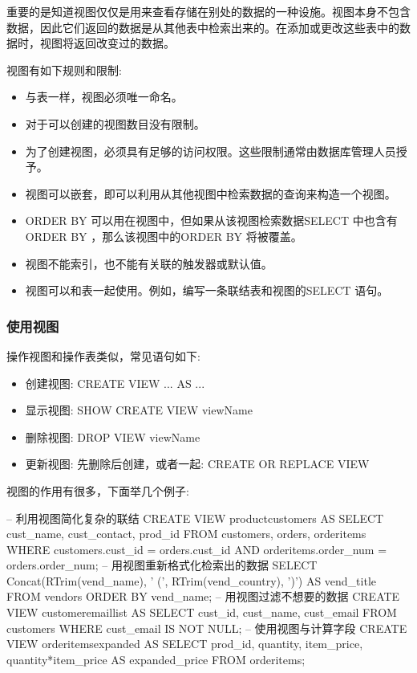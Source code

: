 重要的是知道视图仅仅是用来查看存储在别处的数据的一种设施。视图本身不包含数据，因此它们返回的数据是从其他表中检索出来的。在添加或更改这些表中的数据时，视图将返回改变过的数据。


 视图有如下规则和限制:

 \begin{itemize}
    \item 与表一样，视图必须唯一命名。
    \item 对于可以创建的视图数目没有限制。
    \item 为了创建视图，必须具有足够的访问权限。这些限制通常由数据库管理人员授予。
    \item 视图可以嵌套，即可以利用从其他视图中检索数据的查询来构造一个视图。
    \item ORDER BY 可以用在视图中，但如果从该视图检索数据SELECT 中也含有ORDER BY ，那么该视图中的ORDER BY 将被覆盖。
    \item 视图不能索引，也不能有关联的触发器或默认值。
    \item 视图可以和表一起使用。例如，编写一条联结表和视图的SELECT 语句。
 \end{itemize}

 \subsubsection{使用视图}

操作视图和操作表类似，常见语句如下:
 \begin{itemize}
    \item 创建视图: CREATE VIEW ... AS ...
    \item 显示视图: SHOW CREATE VIEW viewName
    \item 删除视图: DROP VIEW viewName
    \item 更新视图: 先删除后创建，或者一起: CREATE OR REPLACE VIEW
 \end{itemize}

视图的作用有很多，下面举几个例子:

\begin{sql}
-- 利用视图简化复杂的联结
CREATE VIEW productcustomers AS
    SELECT cust_name, cust_contact, prod_id
    FROM customers, orders, orderitems
    WHERE customers.cust_id = orders.cust_id
        AND orderitems.order_num = orders.order_num;
-- 用视图重新格式化检索出的数据
SELECT Concat(RTrim(vend_name), ' (', RTrim(vend_country), ')')
    AS vend_title
    FROM vendors
    ORDER BY vend_name;
-- 用视图过滤不想要的数据
CREATE VIEW customeremaillist AS
    SELECT cust_id, cust_name, cust_email
    FROM customers
    WHERE cust_email IS NOT NULL;
-- 使用视图与计算字段
CREATE VIEW orderitemsexpanded AS
    SELECT prod_id, quantity, item_price, quantity*item_price AS expanded_price
    FROM orderitems;
\end{sql}


